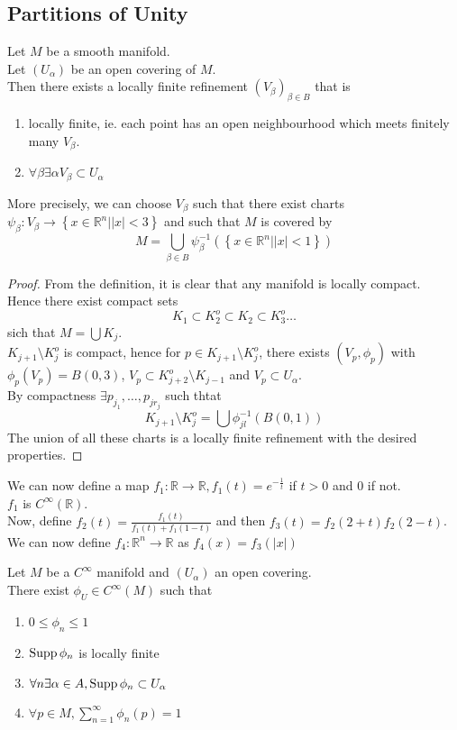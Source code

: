 \documentclass[../main.tex]{subfiles}
\begin{document}
\subsection{Partitions of Unity}
\begin{thm}[Paracompactness]
	Let $M$ be a smooth manifold.\\
	Let $( U_\alpha) $ be an open covering of $M$.\\
	Then there exists a locally finite refinement $ ( V_\beta)_{\beta\in B} $ that is
	\begin{enumerate}
	\item locally finite, ie. each point has an open neighbourhood which meets finitely many $V_\beta$.
	\item $\forall \beta \exists \alpha V_\beta \subset U_\alpha$ 
	\end{enumerate}
	More precisely, we can choose $V_\beta$ such that there exist charts $\psi_\beta:V_\beta \to \left\{ x \in \mathbb{R}^{n}||x|<3 \right\} $ and such that $M$ is covered by
	\[ 
	M = \bigcup_{\beta\in B} \psi_\beta^{-1}( \left\{ x\in \mathbb{R}^{n}| |x|<1 \right\} ) 
	\]
\end{thm}
\begin{proof}
From the definition, it is clear that any manifold is locally compact.\\
Hence there exist compact sets 
\[ 
K_1 \subset K_2^{o} \subset K_2 \subset K_3^{o}\ldots
\]
sich that $M= \bigcup K_j $.\\
$K_{j+1} \setminus K_j ^{o}$ is compact, hence for $p \in K_{j+1} \setminus K_j^{o}$, there exists $( V_p,\phi_p) $ with $\phi_p( V_p) = B( 0,3) $, $V_p \subset K_{j+2}^{o}\setminus K_{j-1} $ and $V_p \subset U_\alpha$.\\
By compactness $\exists p_{j_1} ,\ldots, p_{jr_j} $ such thtat
\[ 
K_{j+1} \setminus K_j^{o} = \bigcup  \phi_{jl}^{-1}( B( 0,1) ) 
\]
The union of all these charts is a locally finite refinement with the desired properties.
\end{proof}
We can now define a map $f_1: \mathbb{R}\to \mathbb{R}, f_1( t) = e^{-\frac{1}{t}}$ if $t>0$ and $0$ if not.\\
$f_1$ is $C^{ \infty }( \mathbb{R} ) $.\\
Now, define $f_2( t) = \frac{f_1( t) }{f_1( t) + f_1( 1-t)  }$ 
and then $f_3( t)= f_2( 2+t) f_2( 2-t)  $.\\
We can now define $f_4: \mathbb{R}^n\to \mathbb{R}$ as $f_4( x) = f_3( |x|) $ 
\begin{thm}
	Let $M$ be a $C^{ \infty }$ manifold and $( U_\alpha) $ an open covering.\\
	There exist $\phi_U\in C^{ \infty }( M) $ such that
	\begin{enumerate}
	\item $0 \leq \phi_n \leq 1$ 
	\item $\operatorname{Supp}\phi_n$ is locally finite
	\item $\forall n \exists \alpha\in A, \operatorname{Supp}\phi_n \subset U_\alpha$ 
	\item $\forall p\in M, \sum_{n=1}^{ \infty }\phi_n( p) =1$ 
	\end{enumerate}
	
\end{thm}
\end{document}
